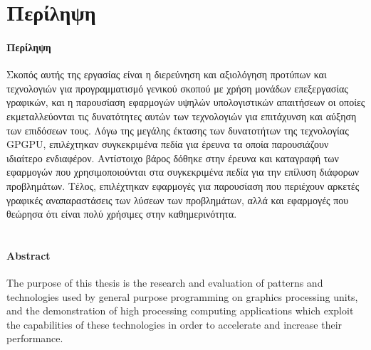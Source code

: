 \chapter{Περίληψη}
\subsubsection{Περίληψη}
Σκοπός αυτής της εργασίας είναι η διερεύνηση και αξιολόγηση προτύπων και τεχνολογιών για προγραμματισμό γενικού σκοπού με χρήση μονάδων επεξεργασίας γραφικών, και η παρουσίαση εφαρμογών υψηλών υπολογιστικών απαιτήσεων οι οποίες εκμεταλλεύονται τις δυνατότητες αυτών των τεχνολογιών για επιτάχυνση και αύξηση των επιδόσεων τους. Λόγω της μεγάλης έκτασης των δυνατοτήτων της τεχνολογίας GPGPU, επιλέχτηκαν συγκεκριμένα πεδία για έρευνα τα οποία παρουσιάζουν ιδιαίτερο ενδιαφέρον. Αντίστοιχο βάρος δόθηκε στην έρευνα και καταγραφή των εφαρμογών που χρησιμοποιούνται στα συγκεκριμένα πεδία για την επίλυση διάφορων προβλημάτων. Τέλος, επιλέχτηκαν εφαρμογές για παρουσίαση που περιέχουν αρκετές γραφικές αναπαραστάσεις των λύσεων των προβλημάτων, αλλά και εφαρμογές που θεώρησα ότι είναι πολύ χρήσιμες στην καθημερινότητα.
\\
\\
\subsubsection{Abstract}
The purpose of this thesis is the research and evaluation of patterns and technologies used by general purpose programming on graphics processing units, and the demonstration of high processing computing applications which exploit the capabilities of these technologies in order to accelerate and increase their performance.

\newpage